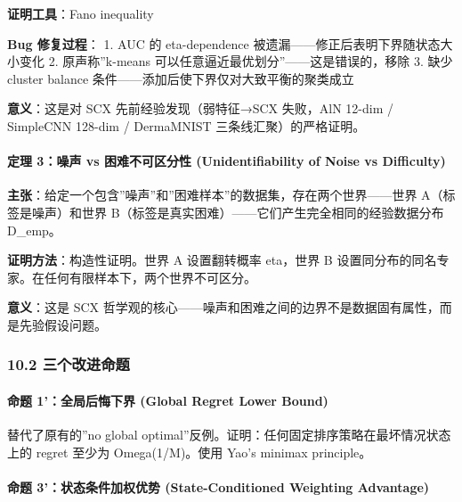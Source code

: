 \documentclass[
  12pt,
]{ctexart}
\begin{document}
\textbf{证明工具}：Fano inequality

\textbf{Bug 修复过程}： 1. AUC 的 eta-dependence
被遗漏------修正后表明下界随状态大小变化 2. 原声称''k-means
可以任意逼近最优划分''------这是错误的，移除 3. 缺少 cluster balance
条件------添加后使下界仅对大致平衡的聚类成立

\textbf{意义}：这是对 SCX 先前经验发现（弱特征→SCX 失败，AlN 12-dim /
SimpleCNN 128-dim / DermaMNIST 三条线汇聚）的严格证明。

\paragraph{定理 3：噪声 vs 困难不可区分性 (Unidentifiability of Noise vs
Difficulty)}\label{ux5b9aux7406-3ux566aux58f0-vs-ux56f0ux96beux4e0dux53efux533aux5206ux6027-unidentifiability-of-noise-vs-difficulty}

\textbf{主张}：给定一个包含''噪声''和''困难样本''的数据集，存在两个世界------世界
A（标签是噪声）和世界
B（标签是真实困难）------它们产生完全相同的经验数据分布 D\_emp。

\textbf{证明方法}：构造性证明。世界 A 设置翻转概率 eta，世界 B
设置同分布的同名专家。在任何有限样本下，两个世界不可区分。

\textbf{意义}：这是 SCX
哲学观的核心------噪声和困难之间的边界不是数据固有属性，而是先验假设问题。

\subsubsection{10.2
三个改进命题}\label{ux4e09ux4e2aux6539ux8fdbux547dux9898}

\paragraph{命题 1'：全局后悔下界 (Global Regret Lower
Bound)}\label{ux547dux9898-1ux5168ux5c40ux540eux6094ux4e0bux754c-global-regret-lower-bound}

替代了原有的''no global
optimal''反例。证明：任何固定排序策略在最坏情况状态上的 regret 至少为
Omega(1/M)。使用 Yao's minimax principle。

\paragraph{命题 3'：状态条件加权优势 (State-Conditioned Weighting
Advantage)}\label{ux547dux9898-3ux72b6ux6001ux6761ux4ef6ux52a0ux6743ux4f18ux52bf-state-conditioned-weighting-advantage}
\end{document}
